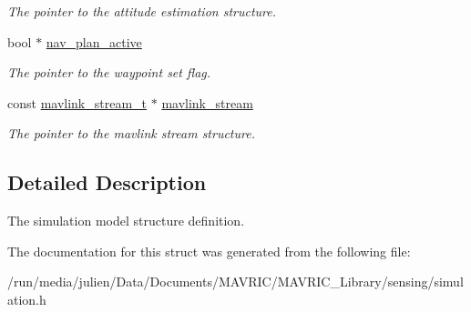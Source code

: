\begin{DoxyCompactItemize}
\begin{DoxyCompactList}\small\item\em The pointer to the attitude estimation structure. \end{DoxyCompactList}\item 
\hypertarget{structsimulation__model__t_a54f29d37d048f0391c127f4e8e2a06ff}{bool $\ast$ \hyperlink{structsimulation__model__t_a54f29d37d048f0391c127f4e8e2a06ff}{nav\+\_\+plan\+\_\+active}}\label{structsimulation__model__t_a54f29d37d048f0391c127f4e8e2a06ff}

\begin{DoxyCompactList}\small\item\em The pointer to the waypoint set flag. \end{DoxyCompactList}\item 
\hypertarget{structsimulation__model__t_a3625e07e408951d530eacdcf1fb336cb}{const \hyperlink{structmavlink__stream__t}{mavlink\+\_\+stream\+\_\+t} $\ast$ \hyperlink{structsimulation__model__t_a3625e07e408951d530eacdcf1fb336cb}{mavlink\+\_\+stream}}\label{structsimulation__model__t_a3625e07e408951d530eacdcf1fb336cb}

\begin{DoxyCompactList}\small\item\em The pointer to the mavlink stream structure. \end{DoxyCompactList}\end{DoxyCompactItemize}


\subsection{Detailed Description}
The simulation model structure definition. 

The documentation for this struct was generated from the following file\+:\begin{DoxyCompactItemize}
\item 
/run/media/julien/\+Data/\+Documents/\+M\+A\+V\+R\+I\+C/\+M\+A\+V\+R\+I\+C\+\_\+\+Library/sensing/simulation.\+h\end{DoxyCompactItemize}
